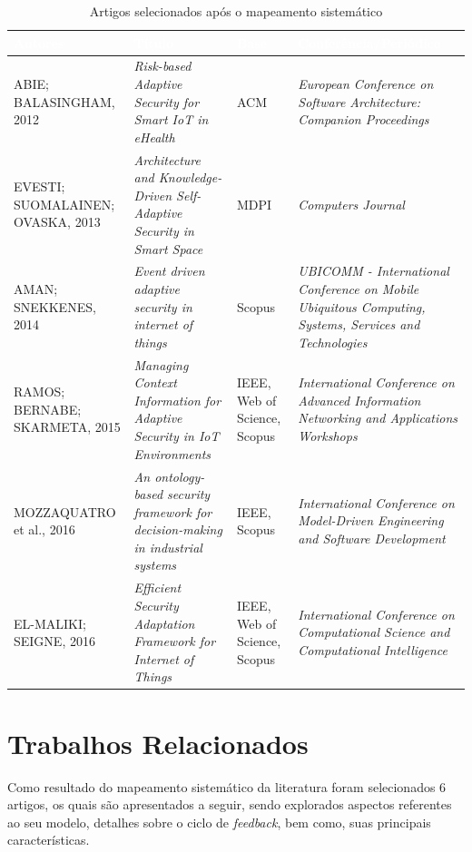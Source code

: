 \documentclass[tid,table]{texufpel} %
\begin{document}
        \begin{table}[h!]
        \centering
	\caption{Artigos selecionados após o mapeamento sistemático}
	\label{artigos-selecionados}
	\begin{tabular}{p{3cm}|p{4cm}|p{2cm}|p{5cm}}
	\rowcolor[HTML]{003366}
	\textcolor{white}{\textbf{Autores}} & \textcolor{white}{\textbf{Título}} & \textcolor{white}{\textbf{Base}} &  \textcolor{white}{\textbf{Conferência/Periódico}}\\
	\hline
	\cellcolor[HTML]{E5EAEA} ABIE; BALASINGHAM, 2012 & \textit{Risk-based Adaptive Security for Smart IoT in eHealth} & ACM & \textit{European Conference on Software Architecture: Companion Proceedings} \\
	\hline
	\cellcolor[HTML]{E5EAEA} EVESTI; SUOMALAINEN; OVASKA, 2013 & \textit{Architecture and Knowledge-Driven Self-Adaptive Security in Smart Space} & MDPI & \textit{Computers Journal} \\
	\hline
	\cellcolor[HTML]{E5EAEA} AMAN; SNEKKENES, 2014 & \textit{Event driven adaptive security in internet of things} & Scopus & \textit{UBICOMM - International Conference on Mobile Ubiquitous Computing, Systems, Services and Technologies} \\
	\hline
	\cellcolor[HTML]{E5EAEA} RAMOS; BERNABE; SKARMETA, 2015 & \textit{Managing Context Information for Adaptive Security in IoT Environments} & IEEE, Web of Science, Scopus & \textit{International Conference on Advanced Information Networking and Applications Workshops} \\
	\hline
	\cellcolor[HTML]{E5EAEA} MOZZAQUATRO et al., 2016 & \textit{An ontology-based security framework for decision-making in industrial systems} & IEEE, Scopus & \textit{International Conference on Model-Driven Engineering and Software Development} \\
	\hline
	\cellcolor[HTML]{E5EAEA} EL-MALIKI; SEIGNE, 2016 & \textit{Efficient Security Adaptation Framework for Internet of Things} & IEEE, Web of Science, Scopus & \textit{International Conference on Computational Science and Computational Intelligence}
	\end{tabular}
	\end{table}

\section{Trabalhos Relacionados}

Como resultado do mapeamento sistemático da literatura foram selecionados 6 artigos, os quais são apresentados a seguir, sendo explorados aspectos referentes ao seu modelo, detalhes sobre o ciclo de \textit{feedback}, bem como, suas principais características. 
\end{document}
